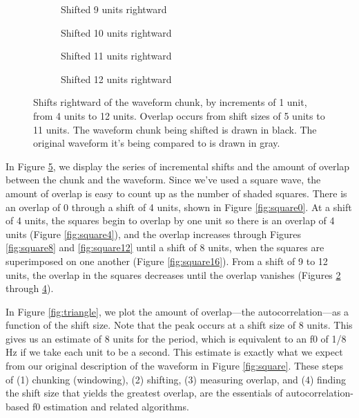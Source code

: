 \documentclass[12pt]{article}
\begin{document}
\begin{figure}
\centering
\ContinuedFloat 
\begin{subfigure}[t]{0.5\textwidth}
  \centering
  \caption{Shifted 9 units rightward}
  \label{fig:square12r}
\end{subfigure}

\begin{subfigure}[t]{0.5\textwidth}
  \centering
  \caption{Shifted 10 units rightward}
  \label{fig:square8r}
\end{subfigure}

\begin{subfigure}[t]{0.5\textwidth}
  \centering
  \caption{Shifted 11 units rightward}
  \label{fig:square4r}
\end{subfigure}

\begin{subfigure}[t]{0.5\textwidth}
  \centering
  \caption{Shifted 12 units rightward}
  \label{fig:square0r}
\end{subfigure}
  \caption{Shifts rightward of the waveform chunk, by increments of 1
    unit, from 4 units to 12 units. Overlap occurs from shift sizes of
    5 units to 11 units. The waveform chunk being shifted is drawn in
    black. The original waveform it's being compared to is drawn in gray.}\label{fig:shift}
\end{figure}

In Figure \ref{fig:shift}, we display the series of
incremental shifts and the amount of overlap between the chunk and the
waveform. Since we've used a square wave, the amount of overlap is easy to count up as the number of shaded
squares. There is an overlap of 0 through a shift of 4 units, shown in
Figure \ref{fig:square0}. At a shift of 4 units, the squares begin to
overlap by one unit so there is an overlap of 4 units (Figure
\ref{fig:square4}), and the overlap increases through Figures
\ref{fig:square8} and \ref{fig:square12} until a shift of 8 units, when the squares are
superimposed on one another (Figure \ref{fig:square16}). From a shift of 9 to 12 units, the
overlap in the squares decreases until the overlap vanishes (Figures
\ref{fig:square8r} through \ref{fig:square0r}). 

In Figure \ref{fig:triangle}, we plot the amount of overlap---the
autocorrelation---as a function of the shift size. Note that the peak
occurs at a shift size of 8 units. This gives us an estimate of 8
units for the period, which is equivalent to an f0 of 1/8 Hz if we
take each unit to be a second. This estimate is exactly what we expect
from our original description of the waveform in Figure
\ref{fig:square}.  These steps of (1) chunking (windowing), (2)
shifting, (3) measuring overlap, and (4) finding the shift size that
yields the greatest overlap, are the essentials of
autocorrelation-based f0 estimation and related algorithms.
\end{document}

